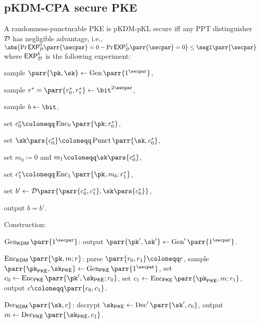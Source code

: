 \subsection{pKDM-CPA secure PKE}

A randomness-puncturable PKE is pKDM-pKL secure iff any PPT distinguisher \(\mathcal{D}\) has negligible advantage, i.e., \(\abs{\Pr{\mathsf{EXP}^0_\D\parr{\secpar} = 0} - \Pr{\mathsf{EXP}^1_\D\parr{\secpar} = 0}} \leq \negl\parr{\secpar}\) where \(\mathsf{EXP}^b_{\mathcal{D}}\) is the following experiment:
\begin{sitemize}
    \item sample \(\parr{\pk,\sk} \gets \Gen\parr{1^\secpar}\),
    \item sample \(r^* = \parr{r^*_0,r^*_1} \gets \bit^{2\secpar}\),
    \item sample \(b \gets \bit\),
    \item set \(c_0^* \coloneqq \Enc_0\parr{\pk;r^*_0}\),
    \item set \(\sk\pars{c^*_0} \coloneqq \Punct\parr{\sk,c_0^*}\),
    \item set \(m_0 \coloneqq 0\) and \(m_1 \coloneqq \sk\pars{c^*_0}\),
    \item set \(c_1^* \coloneqq \Enc_1\parr{\pk,m_b;r^*_1}\),
    \item set \(b' \gets \D\parr{\parr{c^*_0,c^*_1},\sk\pars{c^*_0}}\),
    \item output \(b = b'\).
\end{sitemize}

Construction:

\begin{sitemize}
    \item \(\Gen_{\mathsf{KDM}}\parr{1^\secpar}\):
    output \(\parr{\pk',\sk'} \gets \Gen'\parr{1^\secpar}\).

    \item \(\Enc_{\mathsf{KDM}}\parr{\pk,m;r}\):
    parse \(\parr{r_0,r_1} \coloneqq r\),
    sample \(\parr{\pk_{\mathsf{PKE}},\sk_{\mathsf{PKE}}} \gets \Gen_{\mathsf{PKE}}\parr{1^\secpar}\),
    set \(c_0 \gets \Enc_{\mathsf{PKE}}\parr{\pk',\sk_{\mathsf{PKE}};r_0}\),
    set \(c_1 \gets \Enc_{\mathsf{PKE}}\parr{\pk_{\mathsf{PKE}},m;r_1}\),
    output \(c \coloneqq \parr{c_0,c_1}\).

    \item \(\Dec_{\mathsf{KDM}}\parr{\sk,c}\):
    decrypt \(\sk_{\mathsf{PKE}} \gets \Dec'\parr{\sk',c_0}\),
    output \(m \gets \Dec_{\mathsf{PKE}}\parr{\sk_{\mathsf{PKE}},c_1}\).
\end{sitemize}